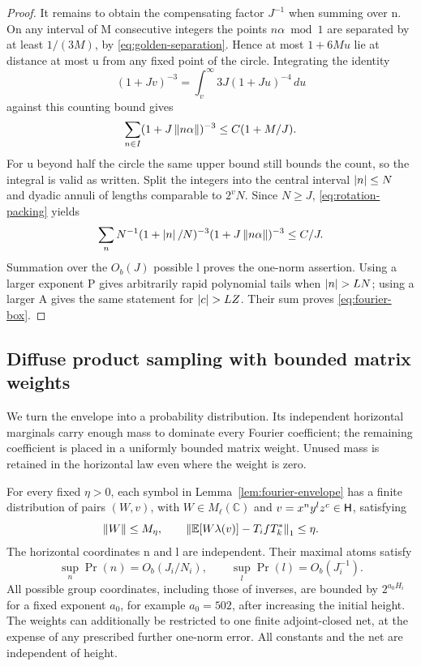 \begin{proof}
It remains to obtain the compensating factor \(J^{-1}\) when summing over n.
On any interval of M
consecutive integers the points \(n\alpha\bmod1\) are separated by at least
\(1/(3M)\), by \eqref{eq:golden-separation}.  Hence at most \(1+6Mu\) lie at
distance at most u from any fixed point of the circle.  Integrating the
identity
\[
 (1+Jv)^{-3}=\int_v^\infty3J(1+Ju)^{-4}\,du
\]
against this counting bound gives
\begin{equation}
\label{eq:rotation-packing}
 \sum_{n\in I}(1+J\left\lVert n\alpha\right\rVert)^{-3}
 \leq C(1+M/J).
\end{equation}
For u beyond half the circle the same upper bound still bounds the count, so
the integral is valid as written.  Split the integers into the central interval
\(\left\lvert n\right\rvert\leq N\) and dyadic annuli of lengths comparable to \(2^vN\).
Since \(N\geq J\), \eqref{eq:rotation-packing} yields
\begin{equation}
\label{eq:horizontal-envelope-sum}
 \sum_n N^{-1}(1+\left\lvert n\right\rvert/N)^{-3}
              (1+J\left\lVert n\alpha\right\rVert)^{-3}\leq C/J.
\end{equation}
Summation over the \(O_b(J)\) possible l proves the one-norm assertion.  Using
a larger exponent P gives arbitrarily rapid polynomial tails when
\(\left\lvert n\right\rvert>L N\); using a larger A gives the same statement for
\(\left\lvert c\right\rvert>L Z\).  Their sum proves \eqref{eq:fourier-box}.
\end{proof}

\subsection{Diffuse product sampling with bounded matrix weights}

We turn the envelope into a probability distribution.  Its independent
horizontal marginals carry enough mass to dominate every Fourier coefficient;
the remaining coefficient is placed in a uniformly bounded matrix weight.
Unused mass is retained in the horizontal law even where the weight is zero.

\begin{lemma}
\label{lem:product-sampler}
For every fixed \(\eta>0\), each symbol in Lemma~\ref{lem:fourier-envelope}
has a finite distribution of pairs \((W,v)\), with
\(W\in M_\ell(\mathbb C)\) and \(v=x^ny^lz^c\in\mathsf H\), satisfying
\[
 \left\lVert W\right\rVert\leq M_\eta,\qquad
 \left\lVert\mathbb E[W\lambda(v)]-T_ifT_k^*\right\rVert_1\leq\eta.
\]
The horizontal coordinates n and l are independent.  Their maximal atoms
satisfy
\begin{equation}
\label{eq:horizontal-atoms}
 \sup_n\Pr(n)=O_b(J_i/N_i),\qquad
 \sup_l\Pr(l)=O_b(J_i^{-1}).
\end{equation}
All possible group coordinates, including those of inverses, are bounded by
\(2^{a_0H_i}\) for a fixed exponent \(a_0\), for example \(a_0=502\), after
increasing the initial height.  The weights can additionally be restricted to
one finite adjoint-closed net, at the expense of any prescribed further
one-norm error.  All constants and the net are independent of height.
\end{lemma}

